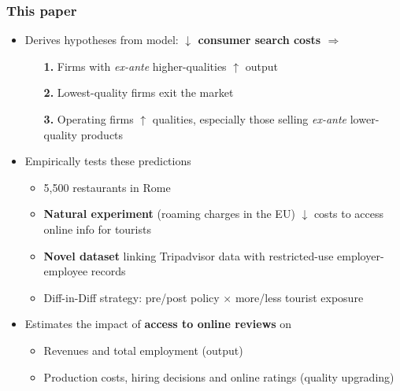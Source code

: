 \documentclass[aspectratio=169]{beamer}
\begin{document}

\begin{frame}
\frametitle{This paper}
\begin{itemize}

\item<1-> Derives hypotheses from model: \textbf{$\downarrow$ consumer search costs $\Rightarrow$}

\begin{itemize}
\item[\textbf{1.}]Firms with \textit{ex-ante} higher-qualities $\uparrow$ output
\vspace{1mm}
\item[\textbf{2.}]Lowest-quality firms exit the market
\vspace{1mm}
\item[\textbf{3.}] Operating firms $\uparrow$ qualities,  especially those selling \textit{ex-ante} lower-quality products
\end{itemize}


\vspace{3mm}

\item<2-> Empirically tests these predictions

\begin{itemize}
\item 5,500 restaurants in Rome %
\vspace{1mm}
\item \textbf{Natural experiment} (roaming charges in the EU) $\downarrow$ costs to access online info for tourists
\vspace{1mm}
\item \textbf{Novel dataset} linking Tripadvisor data with restricted-use employer-employee records
\vspace{1mm}
\item Diff-in-Diff strategy: pre/post policy $\times$ more/less tourist exposure
	\end{itemize}
	
\vspace{3mm}

\item<3> Estimates the impact of \textbf{access to online reviews} on 
\begin{itemize}
	\item Revenues and total employment (output)
	\vspace{1mm}
	\item Production costs, hiring decisions and online ratings (quality upgrading)
	\end{itemize}

\end{itemize}
\end{frame}
\end{document}
